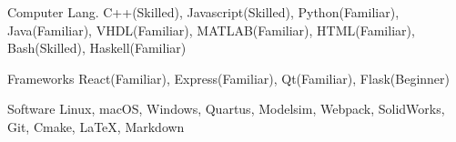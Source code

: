

\begin{cvskills}

  \cvskill
    {Computer Lang.} %
    {C++(Skilled), Javascript(Skilled), Python(Familiar), Java(Familiar), VHDL(Familiar), MATLAB(Familiar), HTML(Familiar), Bash(Skilled), Haskell(Familiar)} %

  \cvskill
    {Frameworks\phantom{aaa}} %
    {React(Familiar), Express(Familiar), Qt(Familiar), Flask(Beginner)} %

  \cvskill
    {Software\phantom{aaaaaa}} %
    {Linux, macOS, Windows, Quartus, Modelsim, Webpack, SolidWorks, Git, Cmake, LaTeX, Markdown} %


\end{cvskills}
